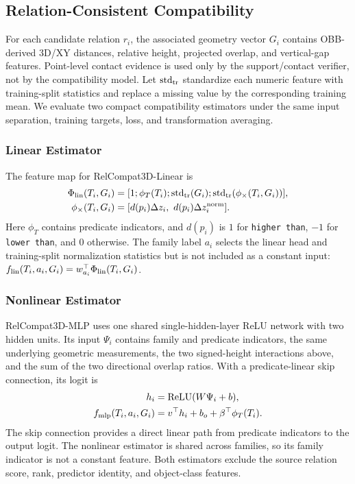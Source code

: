\subsection{Relation-Consistent Compatibility}
\label{sec:Compatibility}
For each candidate relation $r_i$, the associated geometry vector $G_i$ contains OBB-derived 3D/XY distances, relative height, projected overlap, and vertical-gap features. Point-level contact evidence is used only by the support/contact verifier, not by the compatibility model. Let $\operatorname{std}_{\rm tr}$ standardize each numeric feature with training-split statistics and replace a missing value by the corresponding training mean. We evaluate two compact compatibility estimators under the same input separation, training targets, loss, and transformation averaging. 

\subsubsection{Linear Estimator}
The feature map for RelCompat3D-Linear is 
\begin{equation}
\begin{aligned}
\Phi_{\rm lin}(T_i,G_i)&=[1;\phi_T(T_i);\operatorname{std}_{\rm tr}(G_i);
\operatorname{std}_{\rm tr}(\phi_{\times}(T_i,G_i))],\\
\phi_{\times}(T_i,G_i)&=
[d(p_i)\Delta z_i,\ d(p_i)\Delta z_i^{\rm norm}].
\end{aligned}
\end{equation}
Here $\phi_T$ contains predicate indicators, and $d(p_i)$ is $1$ for \texttt{higher than}, $-1$ for \texttt{lower than}, and $0$ otherwise. The family label $a_i$ selects the linear head and training-split normalization statistics but is not included as a constant input: $f_{\rm lin}(T_i,a_i,G_i)=w_{a_i}^\top\Phi_{\rm lin}(T_i,G_i)$.

\subsubsection{Nonlinear Estimator}
RelCompat3D-MLP uses one shared single-hidden-layer ReLU network with two hidden units. Its input $\Psi_i$ contains family and predicate indicators, the same underlying geometric measurements, the two signed-height interactions above, and the sum of the two directional overlap ratios. With a predicate-linear skip connection, its logit is
\begin{equation}
\begin{aligned}
h_i&=\operatorname{ReLU}(W\Psi_i+b),\\
f_{\rm mlp}(T_i,a_i,G_i)&=v^\top h_i+b_o+
\beta^\top\phi_T(T_i).
\end{aligned}
\end{equation}
The skip connection provides a direct linear path from predicate indicators to the output logit. The nonlinear estimator is shared across families, so its family indicator is not a constant feature. Both estimators exclude the source relation score, rank, predictor identity, and object-class features.

